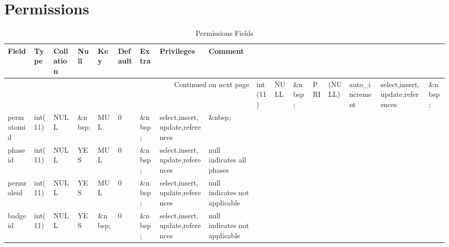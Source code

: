 \documentclass[tablesignature,landscape]{scrartcl}
\begin{document}
\section{Permissions}
\label{sec-15}


\begin{longtable}{|l|l|l|l|l|l|l|l|l|}
\caption{Permissions Fields} \label{tbl:permissionsfields}\\
\hline
 Field         &  Type     &  Collation  &  Null     &  Key      &  Default  &  Extra              &  Privileges                       &  Comment                       \\
\hline
\endhead
\hline\multicolumn{9}{r}{Continued on next page}\
\endfoot
\endlastfoot
\hline
 permissionid  &  int(11)  &  NULL       &  \&nbsp;  &  PRI      &   (NULL)  &  auto\_{}increment  &  select,insert,update,references  &  \&nbsp;                        \\
 permatomid    &  int(11)  &  NULL       &  \&nbsp;  &  MUL      &        0  &  \&nbsp;            &  select,insert,update,references  &  \&nbsp;                        \\
 phaseid       &  int(11)  &  NULL       &  YES      &  MUL      &        0  &  \&nbsp;            &  select,insert,update,references  &  null indicates all phases      \\
 permroleid    &  int(11)  &  NULL       &  YES      &  MUL      &        0  &  \&nbsp;            &  select,insert,update,references  &  null indicates not applicable  \\
 badgeid       &  int(11)  &  NULL       &  YES      &  \&nbsp;  &        0  &  \&nbsp;            &  select,insert,update,references  &  null indicates not applicable  \\
\hline
\end{longtable}
\end{document}
